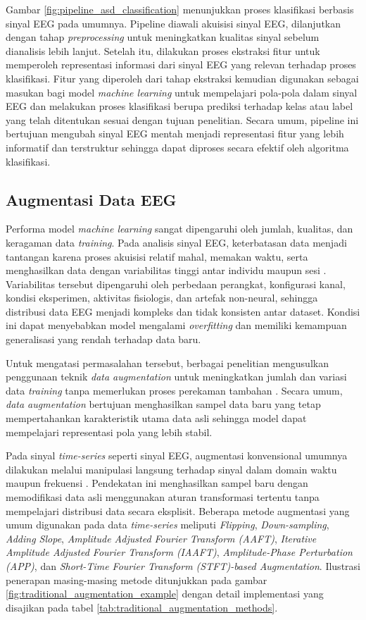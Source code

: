 Gambar \ref{fig:pipeline_asd_classification} menunjukkan proses klasifikasi berbasis sinyal EEG pada umumnya. Pipeline diawali akuisisi sinyal EEG, dilanjutkan dengan tahap \textit{preprocessing} untuk meningkatkan kualitas sinyal sebelum dianalisis lebih lanjut. Setelah itu, dilakukan proses ekstraksi fitur untuk memperoleh representasi informasi dari sinyal EEG yang relevan terhadap proses klasifikasi. Fitur yang diperoleh dari tahap ekstraksi kemudian digunakan sebagai masukan bagi model \textit{machine learning} untuk mempelajari pola-pola dalam sinyal EEG dan melakukan proses klasifikasi berupa prediksi terhadap kelas atau label yang telah ditentukan sesuai dengan tujuan penelitian. Secara umum, pipeline ini bertujuan mengubah sinyal EEG mentah menjadi representasi fitur yang lebih informatif dan terstruktur sehingga dapat diproses secara efektif oleh algoritma klasifikasi.

\subsection{Augmentasi Data EEG}
\label{Augmentasi Data EEG}
Performa model \textit{machine learning} sangat dipengaruhi oleh jumlah, kualitas, dan keragaman data \textit{training}. Pada analisis sinyal EEG, keterbatasan data menjadi tantangan karena proses akuisisi relatif mahal, memakan waktu, serta menghasilkan data dengan variabilitas tinggi antar individu maupun sesi \cite{cross_dataset_eeg}. Variabilitas tersebut dipengaruhi oleh perbedaan perangkat, konfigurasi kanal, kondisi eksperimen, aktivitas fisiologis, dan artefak non-neural, sehingga distribusi data EEG menjadi kompleks dan tidak konsisten antar dataset. Kondisi ini dapat menyebabkan model mengalami \textit{overfitting} dan memiliki kemampuan generalisasi yang rendah terhadap data baru.

Untuk mengatasi permasalahan tersebut, berbagai penelitian mengusulkan penggunaan teknik \textit{data augmentation} untuk meningkatkan jumlah dan variasi data \textit{training} tanpa memerlukan proses perekaman tambahan \cite{eeg_augmentation_review}. Secara umum, \textit{data augmentation} bertujuan menghasilkan sampel data baru yang tetap mempertahankan karakteristik utama data asli sehingga model dapat mempelajari representasi pola yang lebih stabil.

Pada sinyal \textit{time-series} seperti sinyal EEG, augmentasi konvensional umumnya dilakukan melalui manipulasi langsung terhadap sinyal dalam domain waktu maupun frekuensi \cite{traditional_timeseries_aug}. Pendekatan ini menghasilkan sampel baru dengan memodifikasi data asli menggunakan aturan transformasi tertentu tanpa mempelajari distribusi data secara eksplisit. Beberapa metode augmentasi yang umum digunakan pada data \textit{time-series} meliputi \textit{Flipping}, \textit{Down-sampling}, \textit{Adding Slope}, \textit{Amplitude Adjusted Fourier Transform (AAFT)}, \textit{Iterative Amplitude Adjusted Fourier Transform (IAAFT)}, \textit{Amplitude-Phase Perturbation (APP)}, dan \textit{Short-Time Fourier Transform (STFT)-based Augmentation}. Ilustrasi penerapan masing-masing metode ditunjukkan pada gambar \ref{fig:traditional_augmentation_example} dengan detail implementasi yang disajikan pada tabel \ref{tab:traditional_augmentation_methods}.

